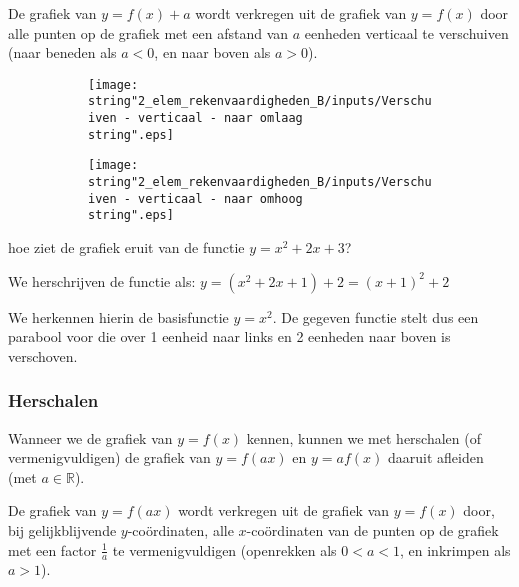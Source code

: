 De grafiek van $y=f(x)+a$ wordt verkregen uit de grafiek
van $y=f(x)$ door alle punten op de grafiek met een afstand van $a$
eenheden verticaal te verschuiven (naar beneden als $a<0$, en naar
boven als $a>0$).



\begin{figure}[h]
	\centering
	\begin{subfigure}{.48\linewidth}
		\texttt{[image: \\string"2\_elem\_rekenvaardigheden\_B/inputs/Verschuiven - verticaal - naar omlaag\\string".eps]}
	\end{subfigure}
	\begin{subfigure}{.48\linewidth}
		\texttt{[image: \\string"2\_elem\_rekenvaardigheden\_B/inputs/Verschuiven - verticaal - naar omhoog\\string".eps]}
	\end{subfigure}
\end{figure}



\begin{voorbeeld}
hoe ziet de grafiek eruit van de functie $y=x^{2}+2x+3$?

We herschrijven de functie als: $y=\left(x^{2}+2x+1\right)+2=\left(x+1\right)^{2}+2$

We herkennen hierin de basisfunctie $y=x^{2}$. De gegeven functie
stelt dus een parabool voor die over 1 eenheid naar links en 2 eenheden
naar boven is verschoven.
\end{voorbeeld}


\subsubsection{Herschalen}

Wanneer we de grafiek van $y=f(x)$ kennen, kunnen we met
herschalen (of vermenigvuldigen) de grafiek van $y=f(ax)$ en $y=af(x)$
daaruit afleiden (met $a\in\mathbb{R}$).

De grafiek van $y=f(ax)$ wordt verkregen uit de grafiek
van $y=f(x)$ door, bij gelijkblijvende $y$-co\"ordinaten, alle $x$-co\"ordinaten
van de punten op de grafiek met een factor $\frac{1}{a}$ te vermenigvuldigen
(openrekken als $0<a<1$, en inkrimpen als $a>1$).

